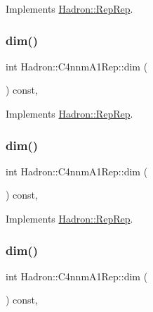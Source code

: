 Implements \mbox{\hyperlink{structHadron_1_1RepRep_a92c8802e5ed7afd7da43ccfd5b7cd92b}{Hadron\+::\+Rep\+Rep}}.

\mbox{\label{structHadron_1_1C4nnmA1Rep_ac851ccfb20da4cca1b97a6279b414442}} 
\subsubsection{\texorpdfstring{dim()}{dim()}\hspace{0.1cm}{\footnotesize\ttfamily [3/5]}}
{\footnotesize\ttfamily int Hadron\+::\+C4nnm\+A1\+Rep\+::dim (\begin{DoxyParamCaption}{ }\end{DoxyParamCaption}) const\hspace{0.3cm}{\ttfamily [inline]}, {\ttfamily [virtual]}}



Implements \mbox{\hyperlink{structHadron_1_1RepRep_a92c8802e5ed7afd7da43ccfd5b7cd92b}{Hadron\+::\+Rep\+Rep}}.

\mbox{\label{structHadron_1_1C4nnmA1Rep_ac851ccfb20da4cca1b97a6279b414442}} 
\subsubsection{\texorpdfstring{dim()}{dim()}\hspace{0.1cm}{\footnotesize\ttfamily [4/5]}}
{\footnotesize\ttfamily int Hadron\+::\+C4nnm\+A1\+Rep\+::dim (\begin{DoxyParamCaption}{ }\end{DoxyParamCaption}) const\hspace{0.3cm}{\ttfamily [inline]}, {\ttfamily [virtual]}}



Implements \mbox{\hyperlink{structHadron_1_1RepRep_a92c8802e5ed7afd7da43ccfd5b7cd92b}{Hadron\+::\+Rep\+Rep}}.

\mbox{\label{structHadron_1_1C4nnmA1Rep_ac851ccfb20da4cca1b97a6279b414442}} 
\subsubsection{\texorpdfstring{dim()}{dim()}\hspace{0.1cm}{\footnotesize\ttfamily [5/5]}}
{\footnotesize\ttfamily int Hadron\+::\+C4nnm\+A1\+Rep\+::dim (\begin{DoxyParamCaption}{ }\end{DoxyParamCaption}) const\hspace{0.3cm}{\ttfamily [inline]}, {\ttfamily [virtual]}}



